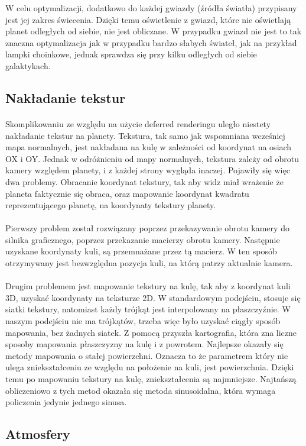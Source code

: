 W celu optymalizacji, dodatkowo do każdej gwiazdy (źródła światła) przypisany jest jej zakres świecenia. Dzięki temu oświetlenie z gwiazd, które nie oświetlają planet odległych od siebie, nie jest obliczane. W przypadku gwiazd nie jest to tak znaczna optymalizacja jak w przypadku bardzo słabych świateł, jak na przykład lampki choinkowe, jednak sprawdza się przy kilku odległych od siebie galaktykach.

\subsection{Nakładanie tekstur}\label{sub:nakladanie tekstur}
\paragraph{}

Skomplikowaniu ze względu na użycie deferred renderingu uległo niestety nakładanie tekstur na planety. Tekstura, tak samo jak wspomniana wcześniej mapa normalnych, jest nakładana na kulę w zależności od koordynat na osiach OX i OY. Jednak w odróżnieniu od mapy normalnych, tekstura zależy od obrotu kamery względem planety, i z każdej strony wygląda inaczej. Pojawiły się więc dwa problemy. Obracanie koordynat tekstury, tak aby widz miał wrażenie że planeta faktycznie się obraca, oraz mapowanie koordynat kwadratu reprezentującego planetę, na koordynaty tekstury planety.

\paragraph{}

Pierwszy problem został rozwiązany poprzez przekazywanie obrotu kamery do silnika graficznego, poprzez przekazanie macierzy obrotu kamery. Następnie uzyskane koordynaty kuli, są przemnażane przez tą macierz. W ten sposób otrzymywany jest bezwzględna pozycja kuli, na którą patrzy aktualnie kamera.

\paragraph{}

Drugim problemem jest mapowanie tekstury na kulę, tak aby z koordynat kuli 3D, uzyskać koordynaty na teksturze 2D. W standardowym podejściu, stosuje się siatki tekstury, natomiast każdy trójkąt jest interpolowany na płaszczyźnie. W naszym podejściu nie ma trójkątów, trzeba więc było uzyskać ciągły sposób mapowania, bez żadnych siatek. Z pomocą przyszła kartografia, która zna liczne sposoby mapowania płaszczyzny na kulę i z powrotem. Najlepsze okazały się metody mapowania o stałej powierzchni. Oznacza to że parametrem który nie ulega zniekształceniu ze względu na położenie na kuli, jest powierzchnia. Dzięki temu po mapowaniu tekstury na kulę, zniekształcenia są najmniejsze. Najtańszą obliczeniowo z tych metod okazała się metoda sinusoidalna, która wymaga policzenia jedynie jednego sinusa.

\subsection{Atmosfery}\label{sub:atmosfery}
\paragraph{}

